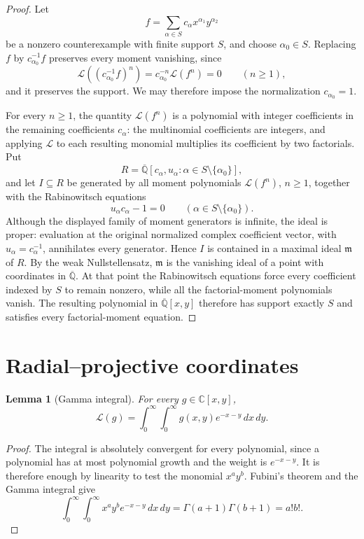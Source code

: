 \documentclass[11pt]{article}
\numberwithin{equation}{section}
\newtheorem{lemma}[lemma]{Lemma}
\theoremstyle{definition}
\theoremstyle{remark}
\newcommand{\C}{\mathbb C}
\newcommand{\Qbar}{\overline{\mathbb Q}}
\newcommand{\Lfac}{\mathcal L}
\begin{document}
\begin{proof}
Let
\[
  f=\sum_{\alpha\in S}c_\alpha x^{\alpha_1}y^{\alpha_2}
\]
be a nonzero counterexample with finite support $S$, and choose
$\alpha_0\in S$.  Replacing $f$ by $c_{\alpha_0}^{-1}f$ preserves every
moment vanishing, since
\[
  \Lfac\!\left((c_{\alpha_0}^{-1}f)^n\right)
  =c_{\alpha_0}^{-n}\Lfac(f^n)=0
  \qquad(n\ge1),
\]
and it preserves the support.  We may therefore impose the normalization
$c_{\alpha_0}=1$.

For every $n\ge1$, the quantity $\Lfac(f^n)$ is a polynomial with integer
coefficients in the remaining coefficients $c_\alpha$: the multinomial
coefficients are integers, and applying $\Lfac$ to each resulting monomial
multiplies its coefficient by two factorials.  Put
\[
  R=\Qbar[c_\alpha,u_\alpha:
       \alpha\in S\setminus\{\alpha_0\}],
\]
and let $I\subseteq R$ be generated by all moment polynomials
$\Lfac(f^n)$, $n\ge1$, together with the Rabinowitsch equations
\[
  u_\alpha c_\alpha-1=0
  \qquad(\alpha\in S\setminus\{\alpha_0\}).
\]
Although the displayed family of moment generators is infinite, the ideal
is proper: evaluation at the original normalized complex coefficient vector,
with $u_\alpha=c_\alpha^{-1}$, annihilates every generator.  Hence $I$ is
contained in a maximal ideal $\mathfrak m$ of $R$.  By the weak
Nullstellensatz, $\mathfrak m$ is the vanishing ideal of a point with
coordinates in $\Qbar$.  At that point the Rabinowitsch equations force every
coefficient indexed by $S$ to remain nonzero, while all the factorial-moment
polynomials vanish.  The resulting polynomial in $\Qbar[x,y]$ therefore has
support exactly $S$ and satisfies every factorial-moment equation.
\end{proof}

\section{Radial--projective coordinates}\label{sec:radial}

\begin{lemma}[Gamma integral]\label{lem:factorial-integral}
For every $g\in\C[x,y]$,
\begin{equation}\label{eq:factorial-integral}
  \Lfac(g)
  =\int_0^\infty\int_0^\infty
    g(x,y)e^{-x-y}\,dx\,dy.
\end{equation}
\end{lemma}

\begin{proof}
The integral is absolutely convergent for every polynomial, since a
polynomial has at most polynomial growth and the weight is $e^{-x-y}$.
It is therefore enough by linearity to test the monomial $x^a y^b$.
Fubini's theorem and the Gamma integral give
\[
  \int_0^\infty\int_0^\infty
  x^a y^b e^{-x-y}\,dx\,dy
  =\Gamma(a+1)\Gamma(b+1)=a!b!.
\]
\end{proof}
\end{document}
